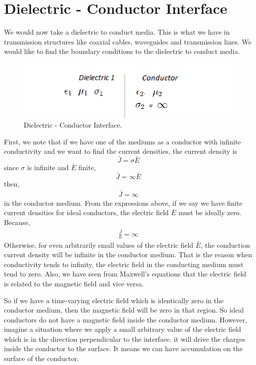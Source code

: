 \section{Dielectric - Conductor Interface}
We would now take a dielectric to conduct media. This is what we have in transmission structures like coaxial cables, waveguides and transmission lines. We would like to find the boundary conditions to the dielectric to conduct media. 
\begin{figure}[h]
\centering
\includegraphics[width=1\linewidth]{./graphics/diemedium5_2}
\caption{Dielectric - Conductor Interface.}
\end{figure}

First, we note that if we have one of the mediums as a  conductor with infinite conductivity and we want to find the current densities, the current density is 
\begin{equation}
\bar{J} = \sigma\bar{E}
\end{equation}
since $\sigma$ is infinite and $\bar{E}$ finite,
\begin{equation*}
\bar{J} = \infty\bar{E}
\end{equation*} 
then,
\begin{align*}
\bar{J} = \infty
\end{align*}
in the conductor medium. From the expressions above, if we say we have finite current densities for ideal conductors, the electric field $\bar{E}$ must be ideally zero. Because,
\begin{align*}
\frac{\bar{J}}{0} = \infty
\end{align*}
Otherwise, for even arbitrarily small values of the electric field $\bar{E}$, the conduction current density will be infinite in the conductor medium. That is the reason when conductivity tends to infinity, the electric field in the conducting medium must tend to zero. Also, we have seen from Maxwell's equations that the electric field is related to the magnetic field and vice versa. 

So if we have a time-varying electric field which is identically zero in the conductor medium, then the magnetic field will be zero in that region. So ideal conductors do not have a magnetic field inside the conductor medium. However, imagine a situation where we apply a small arbitrary value of the electric field which is in the direction perpendicular to the interface. it will drive the charges inside the conductor to the surface. It means we can have accumulation on the surface of the conductor. 

